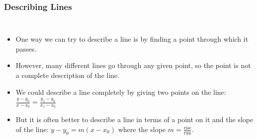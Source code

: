 \documentclass[serif,ignorenonframetext]{beamer}
\begin{document}
\begin{frame}
  \frametitle{Describing Lines}
  \begin{columns}
  \begin{itemize}[<+->]
  \item One way we can try to describe a line is by finding a point
    through which it passes.
  \item However, many different lines go through any given point, so
    the point is not a complete description of the line.
  \item We could describe a line completely by giving two points on
    the line:
    $\displaystyle \frac{y-y_0}{x-x_0} = \frac{y_1-y_0}{x_1-x_0}$
  \item But it is often better to describe a line in terms of a point
    on it and the slope of the line: $y-y_0 = m(x-x_0)$ where the
    slope $m = \frac{\mbox{rise}}{\mbox{run}}$.
  \end{itemize}
  \end{columns}
\end{frame}
\end{document}
